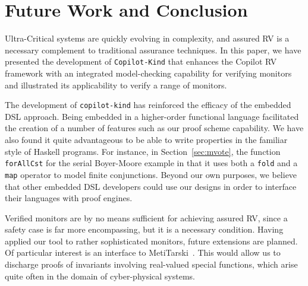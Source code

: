 \section{Future Work and Conclusion}\label{sec:conclusion}

 Ultra-Critical systems are quickly evolving in complexity, and assured
 RV is a necessary complement to traditional assurance techniques.  
In this paper, we have presented the development of
\texttt{Copilot-Kind} that enhances the Copilot RV framework with an
integrated model-checking capability for verifying monitors and
illustrated its applicability to verify a range of monitors.


The development of \texttt{copilot-kind} has reinforced the efficacy
of the embedded DSL approach. Being embedded in a higher-order
functional language facilitated the creation of a number of features
such as our proof scheme capability. We have also found it quite
advantageous to be able to write properties in the familiar style of
Haskell programs. For instance, in Section~\ref{sec:mvote}, the
function \texttt{forAllCst} for the serial Boyer-Moore example in that
it uses both a \texttt{fold} and a \texttt{map} operator to model
finite conjunctions.  Beyond our own purposes, we believe that other
embedded DSL developers could use our designs in order to interface
their languages with proof engines.

Verified  monitors are by no means sufficient for achieving assured RV,
since a safety case is far more encompassing, but it is a necessary
condition.  Having applied our tool to rather
sophisticated monitors,  future extensions are planned.  Of particular
interest is an interface to 
MetiTarski~\cite{AkbarpourPaulson}. This would allow us to discharge
proofs of invariants involving real-valued special functions, which
arise quite often in the domain of cyber-physical systems.

